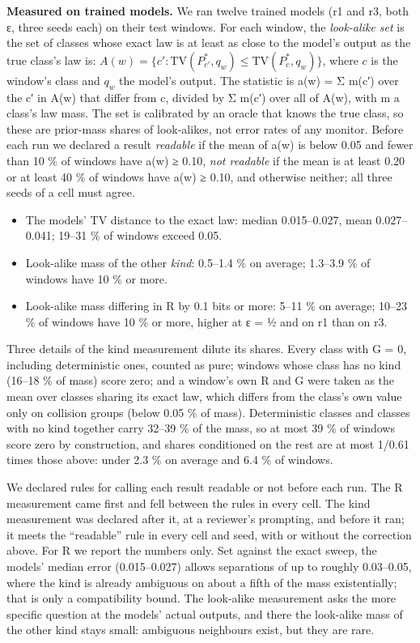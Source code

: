 \documentclass[10pt]{article}
\providecommand{\tightlist}{\setlength{\itemsep}{0pt}\setlength{\parskip}{0pt}}
\begin{document}
\textbf{Measured on trained models.} We ran twelve trained models (r1 and r3, both ε, three seeds each) on their test
windows. For each window, the \emph{look-alike set} is the set of classes whose exact law is at least as close to the model's
output as the true class's law is: \(A(w) = \{c' : \mathrm{TV}(P^*_{c'}, q_w) \le \mathrm{TV}(P^*_{c}, q_w)\}\), where \(c\) is the window's class and \(q_w\) the model's output. The
statistic is a(w) = Σ m(c′) over the c′ in A(w) that differ from c, divided by Σ m(c′) over all of A(w), with m a
class's law mass. The set is calibrated by an oracle that knows the true class, so these are prior-mass shares of
look-alikes, not error rates of any monitor. Before each run we declared a result \emph{readable} if the mean of a(w) is
below 0.05 and fewer than 10 \% of windows have a(w) ≥ 0.10, \emph{not readable} if the mean is at least 0.20 or at least
40 \% of windows have a(w) ≥ 0.10, and otherwise neither; all three seeds of a cell must agree.

\begin{itemize}
\tightlist
\item
  The models' TV distance to the exact law: median 0.015--0.027, mean 0.027--0.041; 19--31 \% of windows exceed 0.05.
\item
  Look-alike mass of the other \emph{kind}: 0.5--1.4 \% on average; 1.3--3.9 \% of windows have 10 \% or more.
\item
  Look-alike mass differing in R by 0.1 bits or more: 5--11 \% on average; 10--23 \% of windows have 10 \% or more, higher at
  ε = ½ and on r1 than on r3.
\end{itemize}

Three details of the kind measurement dilute its shares. Every class with G = 0, including deterministic ones, counted
as pure; windows whose class has no kind (16--18 \% of mass) score zero; and a window's own R and G were taken as the mean
over classes sharing its exact law, which differs from the class's own value only on collision groups (below 0.05 \% of
mass). Deterministic classes and classes with no kind together carry 32--39 \% of the mass, so at most 39 \% of windows score
zero by construction, and shares conditioned on the rest are at most 1/0.61
times those above: under 2.3 \% on average and 6.4 \% of windows.

We declared rules for calling each result readable or not before each run. The R measurement came first and fell
between the rules in every cell. The kind measurement was declared after it, at a reviewer's prompting, and before it
ran; it meets the ``readable'' rule in every cell and seed, with or without the correction above. For R we report the
numbers only. Set against the exact sweep, the models' median error (0.015--0.027) allows separations of up to roughly 0.03--0.05,
where the kind is already ambiguous on about a fifth of the mass existentially; that is only a compatibility bound.
The look-alike measurement asks the more specific question at the models' actual outputs, and there the look-alike mass
of the other kind stays small: ambiguous neighbours exist, but they are rare.
\end{document}

